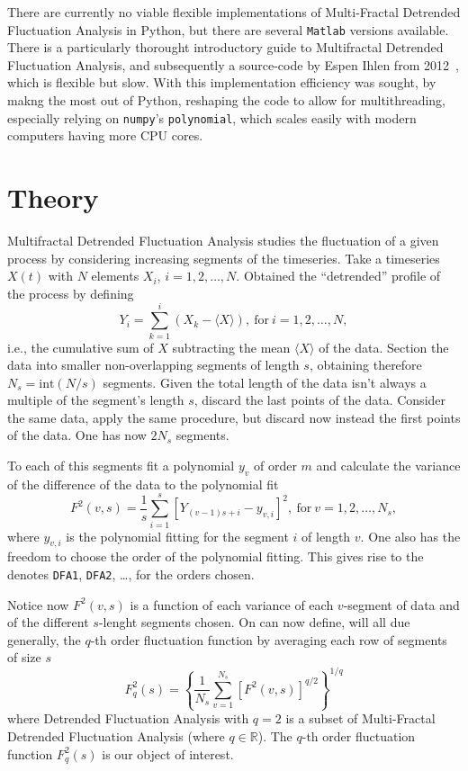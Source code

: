 \documentclass[pre, a4paper, aps, floatfix, superscriptaddress, onecolumn, notitlepage]{revtex4-1} %
\begin{document}
There are currently no viable flexible implementations of Multi-Fractal Detrended Fluctuation Analysis in Python, but there are several \texttt{Matlab} versions available.
There is a particularly thorought introductory guide to Multifractal Detrended Fluctuation Analysis, and subsequently a source-code by Espen Ihlen from 2012~\cite{Ihlen2012}, which is flexible but slow.
With this implementation efficiency was sought, by makng the most out of Python, reshaping the code to allow for multithreading, especially relying on \texttt{numpy}'s \texttt{polynomial}, which scales easily with modern computers having more CPU cores.

\section*{Theory}
Multifractal Detrended Fluctuation Analysis studies the fluctuation of a given process by considering increasing segments of the timeseries.
Take a timeseries $X(t)$ with $N$ elements $X_i$, $i=1,2, \dots, N$.
Obtained the ``detrended'' profile of the process by defining
\begin{equation}
  Y_i = \sum_{k=1}^i \left ( X_k - \langle X \rangle \right),~\text{for}~i=1,2, \dots, N,
\end{equation}
i.e., the cumulative sum of $X$ subtracting the mean $\langle X \rangle$ of the data.
Section the data into smaller non-overlapping segments of length $s$, obtaining therefore $N_s = \text{int}(N/s)$ segments.
Given the total length of the data isn't always a multiple of the segment's length $s$, discard the last points of the data.
Consider the same data, apply the same procedure, but discard now instead the first points of the data.
One has now $2N_s$ segments.

To each of this segments fit a polynomial $y_v$ of order $m$ and calculate the variance of the difference of the data to the polynomial fit
\begin{equation}
  F^2(v,s) = \frac{1}{s} \sum_{i=1}^s [Y_{(v-1)s + i} - y_{v,i}]^2, ~\text{for}~v=1,2, \dots, N_s,
\end{equation}
where $y_{v,i}$ is the polynomial fitting for the segment $i$ of length $v$.
One also has the freedom to choose the order of the polynomial fitting.
This gives rise to the denotes \texttt{DFA1}, \texttt{DFA2}, \dots, for the orders chosen.

Notice now $F^2(v,s)$ is a function of each variance of each $v$-segment of data and of the different $s$-lenght segments chosen.
On can now define, will all due generally, the $q$-th order fluctuation function by averaging each row of segments of size $s$
\begin{equation}
  F_q^2(s) = \left\{\frac{1}{N_s} \sum_{v=1}^{N_s} [F^2(v,s)]^{q/2}\right\}^{1/q}
\end{equation}
where Detrended Fluctuation Analysis with $q=2$ is a subset of Multi-Fractal Detrended Fluctuation Analysis (where $q\in \mathbb{R}$).
The $q$-th order fluctuation function $F_q^2(s)$ is our object of interest.
\end{document}
